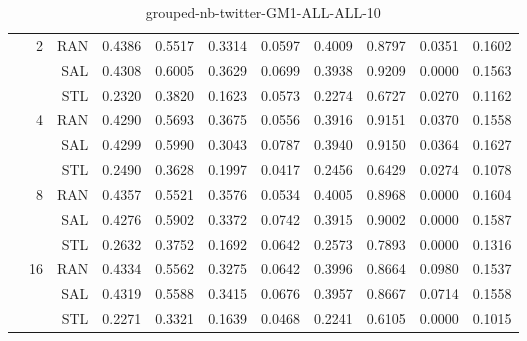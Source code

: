 \begin{center}
\begin{table}[htbp]
\begin{center}
\begin{tabular}{ | r | r | r | r | r | r | r | r | r | r | r |}
 & \multirow{3}{*}{2} & RAN & 0.4386 & 0.5517 & 0.3314 & 0.0597 & 0.4009 & 0.8797 & 0.0351 & 0.1602\\ \cline{3-11}
 &   & SAL & 0.4308 & 0.6005 & 0.3629 & 0.0699 & 0.3938 & 0.9209 & 0.0000 & 0.1563\\ \cline{3-11}
 &   & STL & 0.2320 & 0.3820 & 0.1623 & 0.0573 & 0.2274 & 0.6727 & 0.0270 & 0.1162\\ \cline{2-11}
 & \multirow{3}{*}{4} & RAN & 0.4290 & 0.5693 & 0.3675 & 0.0556 & 0.3916 & 0.9151 & 0.0370 & 0.1558\\ \cline{3-11}
 &   & SAL & 0.4299 & 0.5990 & 0.3043 & 0.0787 & 0.3940 & 0.9150 & 0.0364 & 0.1627\\ \cline{3-11}
 &   & STL & 0.2490 & 0.3628 & 0.1997 & 0.0417 & 0.2456 & 0.6429 & 0.0274 & 0.1078\\ \cline{2-11}
 & \multirow{3}{*}{8} & RAN & 0.4357 & 0.5521 & 0.3576 & 0.0534 & 0.4005 & 0.8968 & 0.0000 & 0.1604\\ \cline{3-11}
 &   & SAL & 0.4276 & 0.5902 & 0.3372 & 0.0742 & 0.3915 & 0.9002 & 0.0000 & 0.1587\\ \cline{3-11}
 &   & STL & 0.2632 & 0.3752 & 0.1692 & 0.0642 & 0.2573 & 0.7893 & 0.0000 & 0.1316\\ \cline{2-11}
 & \multirow{3}{*}{16} & RAN & 0.4334 & 0.5562 & 0.3275 & 0.0642 & 0.3996 & 0.8664 & 0.0980 & 0.1537\\ \cline{3-11}
 &   & SAL & 0.4319 & 0.5588 & 0.3415 & 0.0676 & 0.3957 & 0.8667 & 0.0714 & 0.1558\\ \cline{3-11}
 &   & STL & 0.2271 & 0.3321 & 0.1639 & 0.0468 & 0.2241 & 0.6105 & 0.0000 & 0.1015\\ \cline{2-11}
\hline
\end{tabular}
\caption{grouped-nb-twitter-GM1-ALL-ALL-10}
\end{center}
 \end{table}
\end{center}

